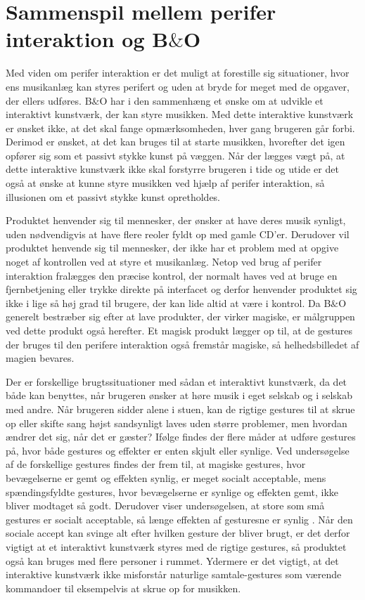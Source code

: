 \section{Sammenspil mellem perifer interaktion og B$\&$O}
\label{Sammenspil mellem perifer interaktion og BO}

Med viden om perifer interaktion er det muligt at forestille sig situationer, hvor ens musikanlæg kan styres perifert og uden at bryde for meget med de opgaver, der ellers udføres. B$\&$O har i den sammenhæng et ønske om at udvikle et interaktivt kunstværk, der kan styre musikken. Med dette interaktive kunstværk er ønsket ikke, at det skal fange opmærksomheden, hver gang brugeren går forbi. Derimod er ønsket, at det kan bruges til at starte musikken, hvorefter det igen opfører sig som et passivt stykke kunst på væggen. Når der lægges vægt på, at dette interaktive kunstværk ikke skal forstyrre brugeren i tide og utide er det også at ønske at kunne styre musikken ved hjælp af perifer interaktion, så illusionen om et passivt stykke kunst opretholdes. 

Produktet henvender sig til mennesker, der ønsker at have deres musik synligt, uden nødvendigvis at have flere reoler fyldt op med gamle CD'er. Derudover vil produktet henvende sig til mennesker, der ikke har et problem med at opgive noget af kontrollen ved at styre et musikanlæg. Netop ved brug af perifer interaktion fralægges den præcise kontrol, der normalt haves ved at bruge en fjernbetjening eller trykke direkte på interfacet og derfor henvender produktet sig ikke i lige så høj grad til brugere, der kan lide altid at være i kontrol. Da B$\&$O generelt bestræber sig efter at lave produkter, der virker magiske, er målgruppen ved dette produkt også herefter. Et magisk produkt lægger op til, at de gestures der bruges til den perifere interaktion også fremstår magiske, så helhedsbilledet af magien bevares. 

Der er forskellige brugtssituationer med sådan et interaktivt kunstværk, da det både kan benyttes, når brugeren ønsker at høre musik i eget selskab og i selskab med andre. Når brugeren sidder alene i stuen, kan de rigtige gestures til at skrue op eller skifte sang højst sandsynligt laves uden større problemer, men hvordan ændrer det sig, når det er gæster? Ifølge \textcite[ss. 276-277]{PDF:WouldYouDoThat} findes der flere måder at udføre gestures på, hvor både gestures og effekter er enten skjult eller synlige. Ved undersøgelse af de forskellige gestures findes der frem til, at magiske gestures, hvor bevægelserne er gemt og effekten synlig, er meget socialt acceptable, mens spændingsfyldte gestures, hvor bevægelserne er synlige og effekten gemt, ikke bliver modtaget så godt. Derudover viser undersøgelsen, at store som små gestures er socialt acceptable, så længe effekten af gesturesne er synlig \parencite[s. 278]{PDF:WouldYouDoThat}. Når den sociale accept kan svinge alt efter hvilken gesture der bliver brugt, er det derfor vigtigt at et interaktivt kunstværk styres med de rigtige gestures, så produktet også kan bruges med flere personer i rummet. Ydermere er det vigtigt, at det interaktive kunstværk ikke misforstår naturlige samtale-gestures som værende kommandoer til eksempelvis at skrue op for musikken. 


